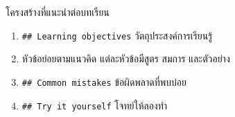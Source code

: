 \documentclass[
  thai,
  12pt,
  letterpaper,
  DIV=11,
  numbers=noendperiod]{scrartcl}
\providecommand{\tightlist}{%
  \setlength{\itemsep}{0pt}\setlength{\parskip}{0pt}}
\begin{document}
โครงสร้างที่แนะนำต่อบทเรียน

\begin{enumerate}
\def\labelenumi{\arabic{enumi}.}
\tightlist
\item
  \texttt{\#\#\ Learning\ objectives} วัตถุประสงค์การเรียนรู้
\item
  หัวข้อย่อยตามแนวคิด แต่ละหัวข้อมีสูตร สมการ และตัวอย่าง
\item
  \texttt{\#\#\ Common\ mistakes} ข้อผิดพลาดที่พบบ่อย
\item
  \texttt{\#\#\ Try\ it\ yourself} โจทย์ให้ลองทำ
\end{enumerate}
\end{document}
